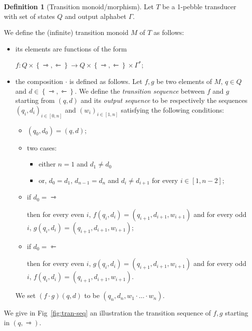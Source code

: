 \documentclass[sigplan,review,anonymous]{acmart}\settopmatter{printfolios=true,printccs=false,printacmref=false}
\newcommand{\set}[1]{\left\{#1 \right\}}
\newcommand{\mleft}{\leftarrowtriangle}
\newcommand{\mright}{\rightarrowtriangle}
\theoremstyle{definition}
\newtheorem{definition}[theorem]{Definition}
\theoremstyle{remark}
\begin{document}
\begin{definition}[Transition monoid/morphism]%
Let $T$ be a 1-pebble transducer with set of states $Q$ and output alphabet $\Gamma$.

We define the (infinite) transition monoid $M$ of $T$ as follows:
\begin{itemize}
\item its elements are functions of the form

$f:Q\times\set{\mright,\mleft}\to Q\times\set{\mright,\mleft}\times \Gamma^*$;
\item the composition $\cdot$ is defined as follows. Let $f, g$ be two elements of $M$, $q\in Q$ and $d\in\set{\mright, \mleft}$. We define the \emph{transition sequence} between 
$f$ and $g$ starting from $(q,d)$ and its \emph{output sequence} to be respectively the sequences $(q_i,d_i)_{i\in[0,n]}$ and  $(w_i)_{i\in[1,n]}$ satisfying the following conditions: 
\begin{itemize}
\item $(q_0,d_0)=(q,d)$;
\item two cases:
\begin{itemize}
  \item either $n=1$ and $d_1\neq d_0$
  \item or, $d_0=d_1$, $d_{n-1}=d_{n}$ and $d_i\neq d_{i+1}$ for every $i\in[1,n-2]$;
\end{itemize}  
\item if $d_0=\mright$

then for every even $i$,
$f(q_i,d_i)=(q_{i+1},d_{i+1}, w_{i+1})$ and for every odd $i$, $g(q_i,d_i)=(q_{i+1},d_{i+1}, w_{i+1})$;
\item if $d_0=\mleft$

then for every even $i$,
$g(q_i,d_i)=(q_{i+1},d_{i+1}, w_{i+1})$ and for every odd $i$, $f(q_i,d_i)=(q_{i+1},d_{i+1}, w_{i+1})$. 
\end{itemize}
We set $(f\cdot g) (q,d)$ to be $(q_n, d_n, w_1\cdot \dots\cdot w_n)$.
\end{itemize}
We give in Fig~\ref{fig:tran-seq} an illustration the transition sequence of $f,g$ starting in $(q,\mright)$.
\begin{figure}[h!]
\end{figure}
\end{definition}
\end{document}
